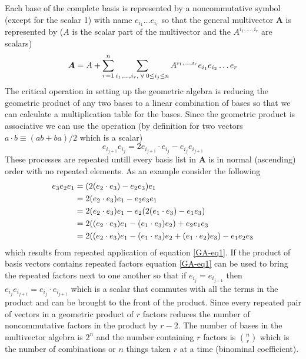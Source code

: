 \documentclass[letterpaper,10pt,english]{sphinxmanual}
\begin{document}
Each base of the complete basis is represented by a noncommutative symbol (except for the scalar 1)
with name $e_{i_{1}}\dots e_{i_{r}}$ so that the general multivector $\bm{A}$ is represented by
($A$ is the scalar part of the multivector and the $A^{i_{1},\dots,i_{r}}$ are scalars)
\begin{gather}
\begin{split}\begin{equation*}
   \boldsymbol{A} = A + \sum_{r=1}^{n}\sum_{i_{1},\dots,i_{r},\;\forall\; 0\le i_{j} \le n} A^{i_{1},\dots,i_{r}}e_{i_{1}}e_{i_{2}}\dots e_{r}
\end{equation*}\end{split}\notag
\end{gather}
The critical operation in setting up the geometric algebra is reducing
the geometric product of any two bases to a linear combination of bases so that
we can calculate a multiplication table for the bases.  Since the geometric
product is associative we can use the operation (by definition for two vectors
$a\cdot b \equiv (ab+ba)/2$  which is a scalar)
\label{GA:equation-eq1}\begin{equation}
   e_{i_{j+1}}e_{i_{j}} = 2e_{i_{j+1}}\cdot e_{i_{j}} - e_{i_{j}}e_{i_{j+1}}
\end{equation}
These processes are repeated untill every basis list in $\bm{A}$ is in normal
(ascending) order with no repeated elements. As an example consider the
following
\begin{gather}
\begin{split}\begin{align*}
   e_{3}e_{2}e_{1} &= (2(e_{2}\cdot e_{3}) - e_{2}e_{3})e_{1} \\
                   &= 2(e_{2}\cdot e_{3})e_{1} - e_{2}e_{3}e_{1} \\
                   &= 2(e_{2}\cdot e_{3})e_{1} - e_{2}(2(e_{1}\cdot e_{3})-e_{1}e_{3}) \\
                   &= 2((e_{2}\cdot e_{3})e_{1}-(e_{1}\cdot e_{3})e_{2})+e_{2}e_{1}e_{3} \\
                   &= 2((e_{2}\cdot e_{3})e_{1}-(e_{1}\cdot e_{3})e_{2}+(e_{1}\cdot e_{2})e_{3})-e_{1}e_{2}e_{3}
\end{align*}\end{split}\notag
\end{gather}
which results from repeated application of equation \eqref{GA-eq1}.  If the product of basis vectors contains repeated factors
equation \eqref{GA-eq1} can be used to bring the repeated factors next to one another so that if $e_{i_{j}} = e_{i_{j+1}}$
then $e_{i_{j}}e_{i_{j+1}} = e_{i_{j}}\cdot e_{i_{j+1}}$ which is a scalar that commutes with all the terms in the product
and can be brought to the front of the product.  Since every repeated pair of vectors in a geometric product of $r$ factors
reduces the number of noncommutative factors in the product by $r-2$. The number of bases in the multivector algebra is $2^{n}$
and the number containing $r$ factors is ${n\choose r}$ which is the number of combinations or $n$ things
taken $r$ at a time (binominal coefficient).
\end{document}
